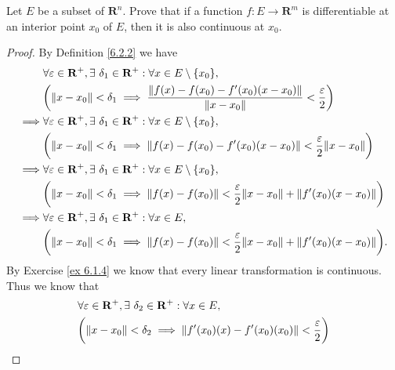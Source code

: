 \begin{exercise}\label{ex 6.4.2}
    Let \(E\) be a subset of \(\mathbf{R}^n\).
    Prove that if a function \(f : E \to \mathbf{R}^m\) is differentiable at an interior point \(x_0\) of \(E\), then it is also continuous at \(x_0\).
\end{exercise}

\begin{proof}
    By Definition \ref{6.2.2} we have
    \begin{align*}
                 & \forall \varepsilon \in \mathbf{R}^+, \exists\ \delta_1 \in \mathbf{R}^+ : \forall x \in E \setminus \{x_0\},                             \\
                 & \bigg(\norm*{x - x_0} < \delta_1 \implies \frac{\norm*{f(x) - f(x_0) - f'(x_0)(x - x_0)}}{\norm*{x - x_0}} < \frac{\varepsilon}{2}\bigg)  \\
        \implies & \forall \varepsilon \in \mathbf{R}^+, \exists\ \delta_1 \in \mathbf{R}^+ : \forall x \in E \setminus \{x_0\},                             \\
                 & \bigg(\norm*{x - x_0} < \delta_1 \implies \norm*{f(x) - f(x_0) - f'(x_0)(x - x_0)} < \frac{\varepsilon}{2} \norm*{x - x_0}\bigg)          \\
        \implies & \forall \varepsilon \in \mathbf{R}^+, \exists\ \delta_1 \in \mathbf{R}^+ : \forall x \in E \setminus \{x_0\},                             \\
                 & \bigg(\norm*{x - x_0} < \delta_1 \implies \norm*{f(x) - f(x_0)} < \frac{\varepsilon}{2} \norm*{x - x_0} + \norm*{f'(x_0)(x - x_0)}\bigg)  \\
        \implies & \forall \varepsilon \in \mathbf{R}^+, \exists\ \delta_1 \in \mathbf{R}^+ : \forall x \in E,                                               \\
                 & \bigg(\norm*{x - x_0} < \delta_1 \implies \norm*{f(x) - f(x_0)} < \frac{\varepsilon}{2} \norm*{x - x_0} + \norm*{f'(x_0)(x - x_0)}\bigg).
    \end{align*}
    By Exercise \ref{ex 6.1.4} we know that every linear transformation is continuous.
    Thus we know that
    \begin{align*}
                 & \forall \varepsilon \in \mathbf{R}^+, \exists\ \delta_2 \in \mathbf{R}^+ : \forall x \in E,                                                    \\
                 & \bigg(\norm*{x - x_0} < \delta_2 \implies \norm*{f'(x_0)(x) - f'(x_0)(x_0)} < \frac{\varepsilon}{2}\bigg)                                      \\

\end{align*}
\end{proof}
